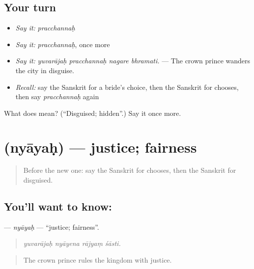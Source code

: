 \subsection*{Your turn}
\begin{itemize}
\raggedright
  \item \emph{Say it:} \emph{pracchannaḥ}
  \item \emph{Say it:} \emph{pracchannaḥ}, once more
  \item \emph{Say it:} \emph{yuvarājaḥ pracchannaḥ nagare bhramati.} — The crown prince wanders the city in disguise.
  \item \emph{Recall:} say the Sanskrit for a bride's choice, then the Sanskrit for chooses, then say \emph{pracchannaḥ} again
\end{itemize}

\begin{tcolorbox}[breakable,colback=teal!4,colframe=teal!35!black,title={Before you move on}]
What does  mean? (\textquotedblleft{}Disguised; hidden\textquotedblright{}.) Say it once more.
\end{tcolorbox}
\section[\texorpdfstring{\sk{न्यायः} (nyāyaḥ)}{न्यायः (nyāyaḥ)}]{ (nyāyaḥ) — justice; fairness}

\label{lesson:SA-C339-nyayah}



\begin{quote}
Before the new one: say the Sanskrit for chooses, then the Sanskrit for disguised.
\end{quote}

\subsection*{You'll want to know: }
\textbf{} — \emph{nyāyaḥ} — \textquotedblleft{}justice; fairness\textquotedblright{}.

\begin{quote}
   
\end{quote}

\begin{quote}
\emph{yuvarājaḥ nyāyena rājyaṃ śāsti.}
\end{quote}

\begin{quote}
The crown prince rules the kingdom with justice.
\end{quote}

